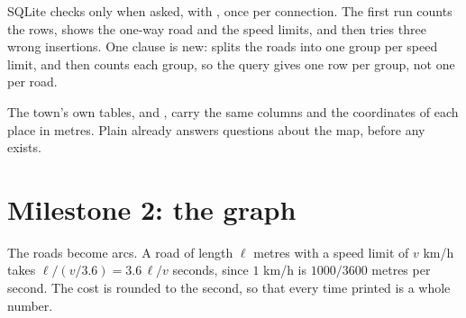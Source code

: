 \label{lst:g12:project-route-planner:db}

SQLite checks  only when asked, with , once per connection. The first run
counts the rows, shows the one-way road and the speed limits, and then tries three wrong insertions. One clause
is new:  splits the roads into one group per speed limit, and  then counts
each group, so the query gives one row per group, not one per road.

\label{lst:g12:project-route-planner:m1}

\label{out:g12:project-route-planner:m1}

The town's own tables,  and , carry the same columns and the coordinates of each place in
metres. Plain  already answers questions about the map, before any  exists.

\label{lst:g12:project-route-planner:queries}

\label{out:g12:project-route-planner:queries}

\section{Milestone 2: the graph}\label{sec:g12:project-route-planner:m2}

The roads become arcs. A road of length $\ell$ metres with a speed limit of $v$ km/h takes $\ell / (v / 3.6) = 3.6\,
\ell / v$ seconds, since $1$ km/h is $1000 / 3600$ metres per second. The cost is rounded to the second, so that every
time printed is a whole number.

